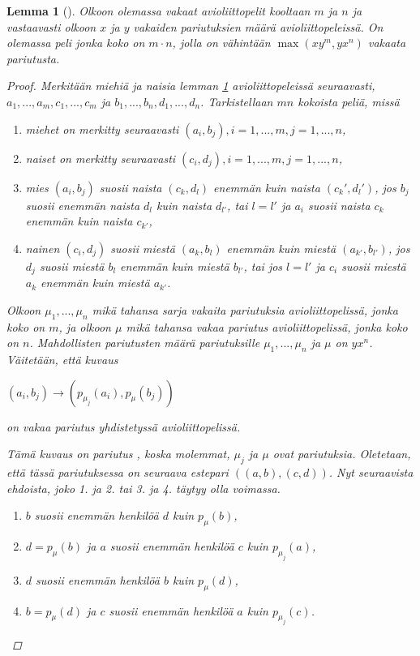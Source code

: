 \documentclass[finnish]{tktltiki2}
\newtheorem{lem}[lau]{Lemma}
\theoremstyle{definition}
\theoremstyle{remark}
\begin{document}
\begin{lem}[\cite{gusfield1989stable}] \label{lemma-koko}
Olkoon olemassa vakaat avioliittopelit kooltaan $m$ ja $n$ ja vastaavasti olkoon $x$ ja $y$ vakaiden pariutuksien määrä avioliittopeleissä. On olemassa peli jonka koko on $m \cdot n$, jolla on vähintään $\max(xy^m, yx^n)$ vakaata pariutusta.

\begin{proof}
Merkitään miehiä ja naisia lemman \ref{lemma-koko} avioliittopeleissä seuraavasti, $a_1,...,a_{m}, c_1,...,c_{m}$ ja $b_1,...,b_{n}, d_1,...,d_{n}$. Tarkistellaan $mn$ kokoista peliä, missä
\begin{enumerate}
\item miehet on merkitty seuraavasti $(a_i,b_j), i = 1,...,m, j = 1,...,n$,
\item naiset on merkitty seuraavasti $(c_i,d_j), i = 1,...,m, j = 1,...,n$,
\item mies $(a_i, b_j)$ suosii naista $(c_k, d_l)$ enemmän kuin naista $(c_k',d_l')$, jos $b_j$ suosii enemmän naista $d_l$ kuin naista $d_{l'}$, tai $l = l'$ ja $a_i$ suosii naista $c_k$ enemmän kuin naista $c_{k'}$,
\item nainen $(c_i, d_j)$ suosii miestä $(a_k, b_l)$ enemmän kuin miestä $(a_{k'}, b_{l'})$, jos $d_j$ suosii miestä $b_l$ enemmän kuin miestä $b_{l'}$, tai jos $l = l'$ ja $c_i$ suosii miestä $a_k$ enemmän kuin miestä $a_{k'}$.
\end{enumerate}

Olkoon $\mu_{1},...,\mu_{n}$ mikä tahansa sarja vakaita pariutuksia avioliittopelissä, jonka koko on $m$, ja olkoon $\mu$ mikä tahansa vakaa pariutus avioliittopelissä, jonka koko on $n$. Mahdollisten pariutusten määrä pariutuksille $\mu_{1},...,\mu_{n}$ ja $\mu$ on $yx^n$. Väitetään, että kuvaus

$(a_i, b_j) \longrightarrow (p_{\mu_{j}}(a_i),p_{\mu}(b_j))$

on vakaa pariutus yhdistetyssä avioliittopelissä.

Tämä kuvaus on pariutus , koska molemmat, $\mu_j$ ja $\mu$ ovat pariutuksia. Oletetaan, että tässä pariutuksessa on seuraava estepari $((a,b),(c,d))$. Nyt seuraavista ehdoista, joko 1. ja 2. tai 3. ja 4. täytyy olla voimassa.

\begin{enumerate}
	\item $b$ suosii enemmän henkilöä $d$ kuin $p_\mu(b)$,
	\item $d = p_\mu(b)$ ja $a$ suosii enemmän henkilöä $c$ kuin $p_{\mu_{j}}(a)$,
	\item $d$ suosii enemmän henkilöä $b$ kuin $p_\mu(d)$,
	\item $b = p_\mu(d)$ ja $c$ suosii enemmän henkilöä $a$ kuin $p_{\mu_{j}}(c)$.
\end{enumerate}


\end{proof}
\end{lem}
\end{document}
